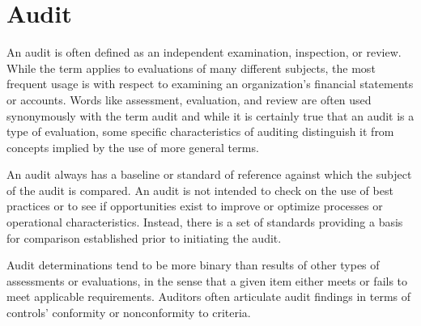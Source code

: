 %
\chapter{Audit}\label{chap:adt}


An audit is often defined as an independent examination, inspection, or review. While the term applies to evaluations of many different subjects, the most frequent usage is with respect to examining an organization’s financial statements or accounts. Words like assessment, evaluation, and review are often used synonymously with the term audit and while it is certainly true that an audit is a type of evaluation, some specific characteristics of auditing distinguish it from concepts implied by the use of more general terms. 

An audit always has a baseline or standard of reference against which the subject of the audit is compared. An audit is not intended to check on the use of best practices or to see if opportunities exist to improve or optimize processes or operational characteristics. Instead, there is a set of standards providing a basis for comparison established prior to initiating the audit. \citep{GANTZ20141}

Audit determinations tend to be more binary than results of other
types of assessments or evaluations, in the sense that a given item either meets or fails to meet applicable requirements. Auditors often articulate audit findings in terms of controls’ conformity or nonconformity to criteria.


